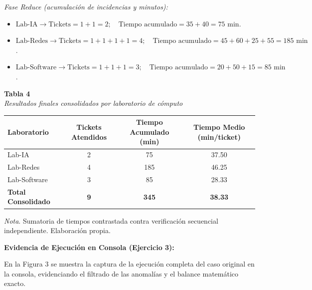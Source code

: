 \documentclass[12pt,a4paper]{article}
\begin{document}
\begin{itemize}
    \noindent\textit{Fase Reduce (acumulación de incidencias y minutos):}
    \begin{itemize}
        \item $\text{Lab-IA} \longrightarrow \text{Tickets} = 1 + 1 = 2; \quad \text{Tiempo acumulado} = 35 + 40 = 75\text{ min}$.
        \item $\text{Lab-Redes} \longrightarrow \text{Tickets} = 1 + 1 + 1 + 1 = 4; \quad \text{Tiempo acumulado} = 45 + 60 + 25 + 55 = 185\text{ min}$.
        \item $\text{Lab-Software} \longrightarrow \text{Tickets} = 1 + 1 + 1 = 3; \quad \text{Tiempo acumulado} = 20 + 50 + 15 = 85\text{ min}$.
    \end{itemize}
\end{itemize}

\begin{center}
\small
\noindent\textbf{Tabla 4} \\
\textit{Resultados finales consolidados por laboratorio de cómputo}
\vspace{4pt}

\begin{tabular}{lccc}
    \toprule
    \textbf{Laboratorio} & \textbf{Tickets Atendidos} & \textbf{Tiempo Acumulado (min)} & \textbf{Tiempo Medio (min/ticket)} \\
    \midrule
    Lab-IA & 2 & 75 & 37.50 \\
    Lab-Redes & 4 & 185 & 46.25 \\
    Lab-Software & 3 & 85 & 28.33 \\
    \midrule
    \textbf{Total Consolidado} & \textbf{9} & \textbf{345} & \textbf{38.33} \\
    \bottomrule
\end{tabular}
\vspace{3pt}

\raggedright\footnotesize\textit{Nota}. Sumatoria de tiempos contrastada contra verificación secuencial independiente. Elaboración propia.
\end{center}

\vspace{0.2cm}
\noindent\textbf{Evidencia de Ejecución en Consola (Ejercicio 3):}

En la Figura 3 se muestra la captura de la ejecución completa del caso original en la consola, evidenciando el filtrado de las anomalías y el balance matemático exacto.
\end{document}
